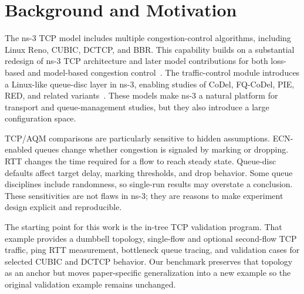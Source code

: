 \section{Background and Motivation}

The ns-3 TCP model includes multiple congestion-control algorithms, including Linux Reno, CUBIC, DCTCP, and BBR. This capability builds on a substantial redesign of ns-3 TCP architecture and later model contributions for both loss-based and model-based congestion control~\cite{Casoni2016NextGenerationTcp,Nguyen2016TcpVariants,Jain2018Bbr}. The traffic-control module introduces a Linux-like queue-disc layer in ns-3, enabling studies of CoDel, FQ-CoDel, PIE, RED, and related variants~\cite{Imputato2016TrafficControl,Shravya2016Pie}. These models make ns-3 a natural platform for transport and queue-management studies, but they also introduce a large configuration space.

TCP/AQM comparisons are particularly sensitive to hidden assumptions. ECN-enabled queues change whether congestion is signaled by marking or dropping. RTT changes the time required for a flow to reach steady state. Queue-disc defaults affect target delay, marking thresholds, and drop behavior. Some queue disciplines include randomness, so single-run results may overstate a conclusion. These sensitivities are not flaws in ns-3; they are reasons to make experiment design explicit and reproducible.

The starting point for this work is the in-tree TCP validation program. That example provides a dumbbell topology, single-flow and optional second-flow TCP traffic, ping RTT measurement, bottleneck queue tracing, and validation cases for selected CUBIC and DCTCP behavior. Our benchmark preserves that topology as an anchor but moves paper-specific generalization into a new example so the original validation example remains unchanged.
